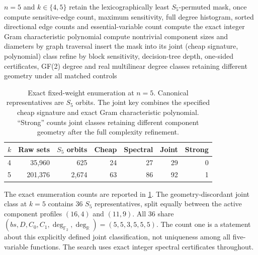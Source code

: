 \documentclass[twoside,12pt,letterpaper]{article}
\theoremstyle{definition}
\begin{document}
\begin{algorithm}[H]
\caption{Exact exhaustive sensitivity-geometry separation search}\label{alg:search}
\begin{algorithmic}[1]
\Require $n=5$ and $k\in\{4,5\}$
\State retain the lexicographically least $S_5$-permuted mask, once
\EndFor
{}
\State compute sensitive-edge count, maximum sensitivity, full degree histogram,
\Statex \hspace{\algorithmicindent} sorted directional edge counts and essential-variable count
\State compute the exact integer Gram characteristic polynomial
\State compute nontrivial component sizes and diameters by graph traversal
\State insert the mask into its joint (cheap signature, polynomial) class
\EndFor
{}
\State refine by block sensitivity, decision-tree depth, one-sided certificates,
\Statex \hspace{\algorithmicindent} GF(2) degree and real multilinear degree
\EndFor
\State \Return classes retaining different geometry under all matched controls
\end{algorithmic}
\end{algorithm}

\begin{table}[H]
\centering
\caption{Exact fixed-weight enumeration at $n=5$. Canonical representatives are $S_5$ orbits. The joint key combines the specified cheap signature and exact Gram characteristic polynomial. ``Strong'' counts joint classes retaining different component geometry after the full complexity refinement.}\label{tab:searchcounts}
\small\setlength{\tabcolsep}{4pt}
\begin{tabular}{lrrrrrr}\toprule
$k$ & Raw sets & $S_5$ orbits & Cheap & Spectral & Joint & Strong\\\midrule
4 & 35,960 & 625 & 24 & 27 & 29 & 0\\
5 & 201,376 & 2,674 & 63 & 86 & 92 & 1\\\bottomrule
\end{tabular}
\end{table}

The exact enumeration counts are reported in \cref{tab:searchcounts}. The geometry-discordant joint class at $k=5$ contains 36 $S_5$ representatives, split equally between the active component profiles $(16,4)$ and $(11,9)$. All 36 share $(bs,D,C_0,C_1,\deg_{\mathbb F_2},\deg_{\mathbb R})=(5,5,3,5,5,5)$. The count one is a statement about this explicitly defined joint classification, not uniqueness among all five-variable functions. The search uses exact integer spectral certificates throughout.
\end{document}
